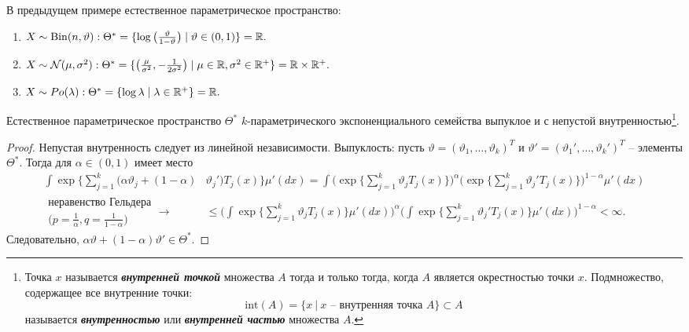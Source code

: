 \begin{exmp}
	В предыдущем примере естественное параметрическое пространство:
	\begin{enumerate}
		\item $X \sim \mathrm{Bin}(n, \vartheta): \Theta^* = \{\log\big(\frac{\vartheta}{1-\vartheta}\big) \mid \vartheta \in (0, 1) \} = \mathbb{R}.$
		\item $X \sim \mathcal{N}(\mu, \sigma^2): \Theta^* = \{\big(\frac{\mu}{\sigma^2}, -\frac{1}{2\sigma^2}\big) \mid \mu \in \mathbb{R}, \sigma^2 \in \mathbb{R}^+ \} = \mathbb{R} \times \mathbb{R}^+.$
		\item $X \sim Po(\lambda): \Theta^* = \{\log \lambda \mid \lambda \in \mathbb{R}^+ \} = \mathbb{R}.$
	\end{enumerate}
\end{exmp}

\begin{thm}
	Естественное параметрическое пространство $\Theta^*$ $k$-параметрического экспоненциального семейства выпуклое и с непустой внутренностью\footnote{
			 Точка $x$ называется \textbf{\textit{внутренней точкой}} множества $A$ тогда и только тогда, когда $A$ является окрестностью точки $x$. Подмножество, содержащее все внутренние точки:
			 \[\mathrm{int}(A) = \{ x\ |\ x \text{ -- внутренняя точка } A\} \subset A \]
			называется \textbf{\textit{внутренностью}} или \textbf{\textit{внутренней частью}} множества $A$.
		}.
\end{thm}
\begin{proof}
	Непустая внутренность следует из линейной независимости. Выпуклость: пусть $\vartheta = (\vartheta_1, \dots, \vartheta_k)^T$ и $\vartheta' = (\vartheta_1', \dots, \vartheta_k')^T$ -- элементы $\Theta^*$. Тогда для $\alpha \in (0, 1)$ имеет место
	\[ \begin{aligned}
	  \int \exp \Big \{ \sum_{j = 1}^{k} (\alpha \vartheta_j + (1-\alpha) & \vartheta_j') T_j(x) \Big\}\mu'(dx) = \int \Big(\exp \Big \{\sum_{j = 1}^{k} \vartheta_j T_j(x) \Big\}\Big)^\alpha \Big(\exp \Big \{\sum_{j = 1}^{k} \vartheta_j' T_j(x) \Big\}\Big)^{1-\alpha} \mu'(dx) \\
	  \begin{aligned}\text{неравенство Гельдера} \\ \Big(p = \frac{1}{\alpha}, q = \frac{1}{1 - \alpha}\Big) \end{aligned}\longrightarrow & \leq  \Bigg(\int \exp \Big \{\sum_{j = 1}^{k} \vartheta_j T_j(x) \Big\}\mu'(dx)\Bigg)^\alpha \Bigg(\int\exp \Big \{\sum_{j = 1}^{k} \vartheta_j' T_j(x) \Big\}\mu'(dx) \Bigg)^{1-\alpha} < \infty.
	\end{aligned} \]
	Следовательно, $\alpha \vartheta + (1-\alpha)\vartheta' \in \Theta^*$.
\end{proof}


